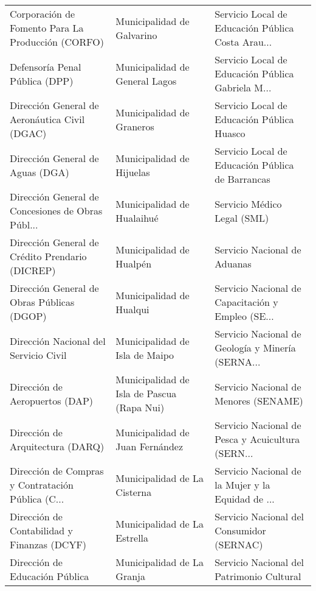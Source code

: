 \documentclass[11pt]{article}
\begin{document}
\begin{longtable}{ p{5cm} | p{5cm} | p{5cm} }
 Corporación de Fomento Para La Producción (CORFO) &                         Municipalidad de Galvarino &  Servicio Local de Educación Pública Costa Arau... \\
                    Defensoría Penal Pública (DPP) &                     Municipalidad de General Lagos &  Servicio Local de Educación Pública Gabriela M... \\
     Dirección General de Aeronáutica Civil (DGAC) &                          Municipalidad de Graneros &         Servicio Local de Educación Pública Huasco \\
                  Dirección General de Aguas (DGA) &                          Municipalidad de Hijuelas &   Servicio Local de Educación Pública de Barrancas \\
 Dirección General de Concesiones de Obras Públ... &                         Municipalidad de Hualaihué &                        Servicio Médico Legal (SML) \\
   Dirección General de Crédito Prendario (DICREP) &                           Municipalidad de Hualpén &                       Servicio Nacional de Aduanas \\
        Dirección General de Obras Públicas (DGOP) &                           Municipalidad de Hualqui &  Servicio Nacional de Capacitación y Empleo (SE... \\
             Dirección Nacional del Servicio Civil &                     Municipalidad de Isla de Maipo &  Servicio Nacional de Geología y Minería (SERNA... \\
                    Dirección de Aeropuertos (DAP) &         Municipalidad de Isla de Pascua (Rapa Nui) &              Servicio Nacional de Menores (SENAME) \\
                  Dirección de Arquitectura (DARQ) &                    Municipalidad de Juan Fernández &  Servicio Nacional de Pesca y Acuicultura (SERN... \\
 Dirección de Compras y Contratación Pública (C... &                       Municipalidad de La Cisterna &  Servicio Nacional de la Mujer y la Equidad de ... \\
       Dirección de Contabilidad y Finanzas (DCYF) &                       Municipalidad de La Estrella &          Servicio Nacional del Consumidor (SERNAC) \\
                    Dirección de Educación Pública &                         Municipalidad de La Granja &          Servicio Nacional del Patrimonio Cultural \\

\end{longtable}
\end{document}
